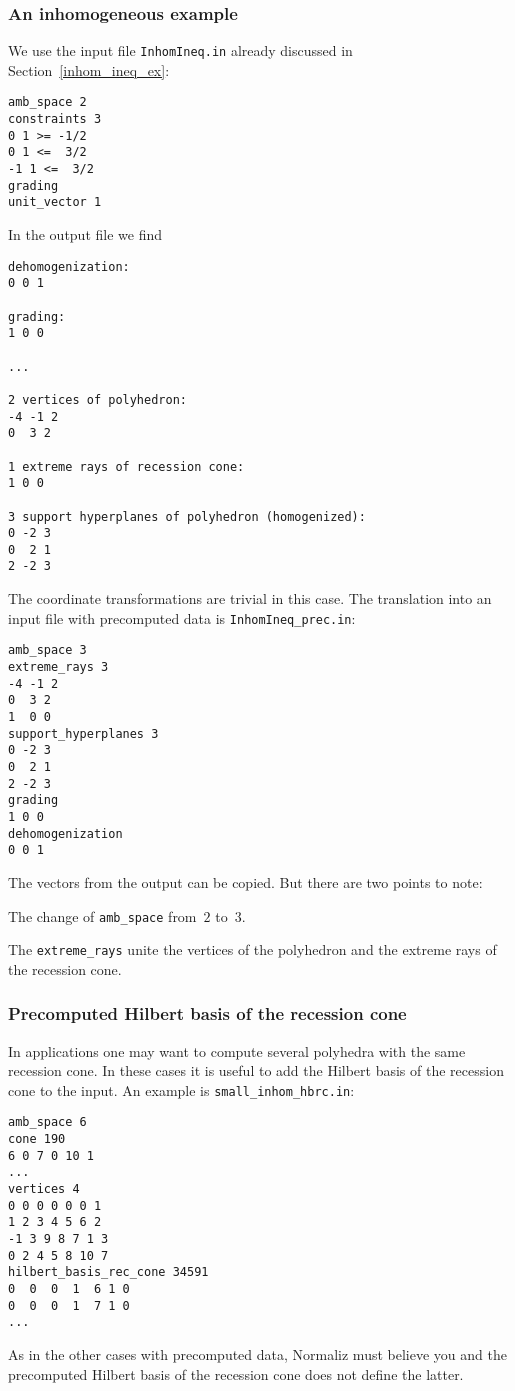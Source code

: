 \subsubsection{An inhomogeneous example}\label{inhom_prec}
We use the input file \verb|InhomIneq.in| already discussed in Section~\ref{inhom_ineq_ex}:
\begin{Verbatim}
amb_space 2
constraints 3
0 1 >= -1/2
0 1 <=  3/2
-1 1 <=  3/2
grading
unit_vector 1
\end{Verbatim}
In the output file we find
\begin{Verbatim}
dehomogenization:
0 0 1 

grading:
1 0 0 

...

2 vertices of polyhedron:
-4 -1 2
0  3 2

1 extreme rays of recession cone:
1 0 0

3 support hyperplanes of polyhedron (homogenized):
0 -2 3
0  2 1
2 -2 3
\end{Verbatim}
The coordinate transformations are trivial in this case. The translation into an input file with precomputed data is \verb|InhomIneq_prec.in|:
\begin{Verbatim}
amb_space 3
extreme_rays 3
-4 -1 2
0  3 2
1  0 0
support_hyperplanes 3
0 -2 3
0  2 1
2 -2 3
grading
1 0 0
dehomogenization
0 0 1
\end{Verbatim}
The vectors from the output can be copied. But there are two points to note:
\begin{arab}
	\item The change of \verb|amb_space| from~$2$ to~$3$.
	\item The \verb|extreme_rays| unite the vertices of the polyhedron and the extreme rays of the recession cone.
\end{arab}


\subsubsection{Precomputed Hilbert basis of the recession cone}\label{HB_rec_cone}

In applications one may want to compute several polyhedra with the same recession cone. In these cases it is useful to add the Hilbert basis of the recession cone to the input. An example is \verb|small_inhom_hbrc.in|:
\begin{Verbatim}
amb_space 6
cone 190
6 0 7 0 10 1
...
vertices 4
0 0 0 0 0 0 1
1 2 3 4 5 6 2
-1 3 9 8 7 1 3
0 2 4 5 8 10 7
hilbert_basis_rec_cone 34591
0  0  0  1  6 1 0
0  0  0  1  7 1 0
...
\end{Verbatim}
As in the other cases with precomputed data, Normaliz must believe you and the precomputed Hilbert basis of the recession cone does not define the latter.

